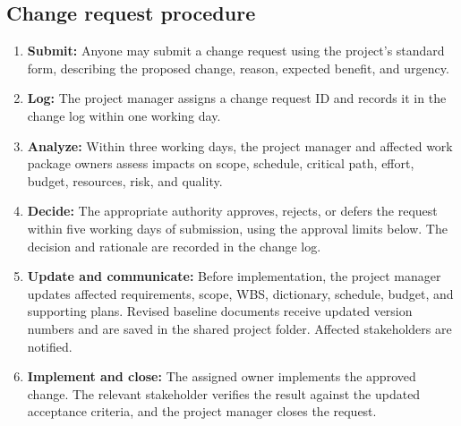 \subsection{Change request procedure}\label{sec:1.11}
\begin{enumerate}
\item \textbf{Submit:} Anyone may submit a change request using the project's standard form, describing the proposed change, reason, expected benefit, and urgency.
\item \textbf{Log:} The project manager assigns a change request ID and records it in the change log within one working day.
\item \textbf{Analyze:} Within three working days, the project manager and affected work package owners assess impacts on scope, schedule, critical path, effort, budget, resources, risk, and quality.
\item \textbf{Decide:} The appropriate authority approves, rejects, or defers the request within five working days of submission, using the approval limits below. The decision and rationale are recorded in the change log.
\item \textbf{Update and communicate:} Before implementation, the project manager updates affected requirements, scope, WBS, dictionary, schedule, budget, and supporting plans. Revised baseline documents receive updated version numbers and are saved in the shared project folder. Affected stakeholders are notified.
\item \textbf{Implement and close:} The assigned owner implements the approved change. The relevant stakeholder verifies the result against the updated acceptance criteria, and the project manager closes the request.
\end{enumerate}


